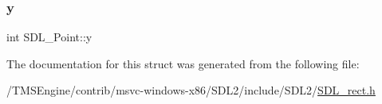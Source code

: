 \mbox{\label{struct_s_d_l___point_aaa68aefa869f6bdf46367a70bd9414b0}} 
\subsubsection{\texorpdfstring{y}{y}}
{\footnotesize\ttfamily int S\+D\+L\+\_\+\+Point\+::y}



The documentation for this struct was generated from the following file\+:\begin{DoxyCompactItemize}
\item 
/\+T\+M\+S\+Engine/contrib/msvc-\/windows-\/x86/\+S\+D\+L2/include/\+S\+D\+L2/\hyperlink{_s_d_l__rect_8h}{S\+D\+L\+\_\+rect.\+h}\end{DoxyCompactItemize}
